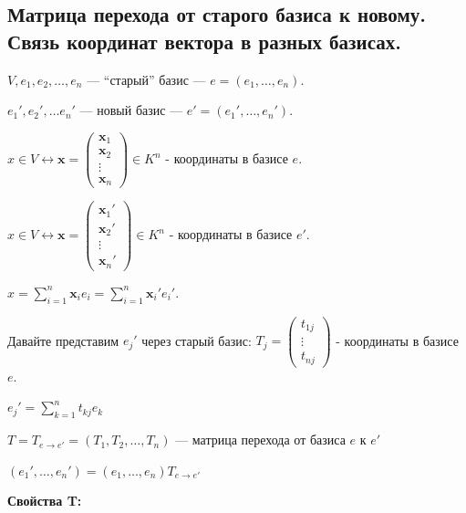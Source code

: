 \subsection{Матрица перехода от старого базиса к новому. Связь координат вектора в разных базисах.}

\(V, e_1, e_2, \ldots , e_n\) --- ``старый'' базис --- \(e = (e_1, \dots, e_n)\).

\(e_1',e_2',\ldots e_n'\) --- новый базис --- \(e' = (e_1', \dots, e_n')\).

\(x\in V \leftrightarrow \mathbf{x} = \begin{pmatrix}
    \mathbf{x}_1    \\
    \mathbf{x}_2    \\
    \vdots \\
    \mathbf{x}_n
\end{pmatrix} \in K^n\)  - координаты в базисе \(e\).

\(x\in V \leftrightarrow \mathbf{x} = \begin{pmatrix}
    \mathbf{x}_1'   \\
    \mathbf{x}_2'   \\
    \vdots \\
    \mathbf{x}_n'
\end{pmatrix} \in K^n\)  - координаты в базисе \(e'\).

\(x = \sum\limits_{i=1}^n \mathbf{x}_i e_i = \sum\limits_{i=1}^n \mathbf{x}_i' e_i'\).

Давайте представим \(e_j'\) через старый базис: \(T_j = \begin{pmatrix}
    t_{1j} \\
    \vdots \\
    t_{nj}
\end{pmatrix}\) - координаты в базисе \(e\).

$e_j' = \displaystyle \sum_{k=1}^{n} t_{kj}e_k$

\(T = T_{e \rightarrow e'} = (T_1, T_2, \ldots, T_n)\) --- матрица перехода от базиса $e$ к $e'$

\((e_1', \ldots, e_n') = (e_1, \ldots, e_n) T_{e \rightarrow e'}\)

\textbf{Свойства T:}

